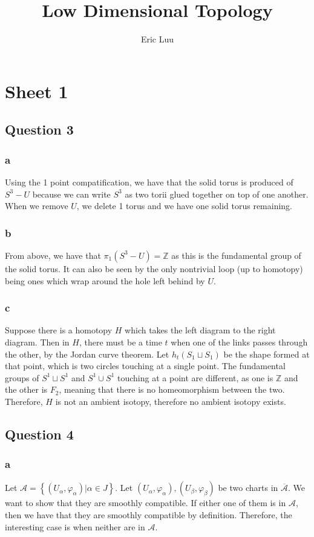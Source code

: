 \documentclass{article}
\title{Low Dimensional Topology}
\author{Eric Luu}
\theoremstyle{definition}
\numberwithin{theorem}{section}
\numberwithin{equation}{section}
\newcommand{\atlas}{\mathcal{A}}
\begin{document}
\section{Sheet 1}


\subsection{Question 3}

\subsubsection{a}
Using the 1 point compatification, we have that the solid torus is produced of $S^3 - U$ because we can write $S^3$ as two torii glued together on top of one another. When we remove $U$, we delete 1 torus and we have one solid torus remaining. 
\subsubsection{b}
From above, we have that $\pi_1(S^3 - U) = \mathbb{Z}$ as this is the fundamental group of the solid torus. It can also be seen by the only nontrivial loop (up to homotopy) being ones which wrap around the hole left behind by $U$. 
\subsubsection{c}
Suppose there is a homotopy $H$ which takes the left diagram to the right diagram. Then in $H$, there must be a time $t$ when one of the links passes through the other, by the Jordan curve theorem. Let $h_t(S_1 \sqcup S_1)$ be the shape formed at that point, which is two circles touching at a single point. The fundamental groups of $S^1 \sqcup S^1$ and $S^1 \cup S^1$ touching at a point are different, as one is $\mathbb{Z}$ and the other is $F_2$, meaning that there is no homeomorphism between the two. Therefore, $H$ is not an ambient isotopy, therefore no ambient isotopy exists. 

\subsection{Question 4}
\subsubsection{a}
Let $\atlas = \left\{(U_\alpha, \varphi_\alpha) | \alpha \in J\right\}$. Let $(U_\alpha, \varphi_\alpha), (U_\beta, \varphi_\beta)$ be two charts in $\overline{\atlas}$. We want to show that they are smoothly compatible. If either one of them is in $\atlas$, then we have that they are smoothly compatible by definition. Therefore, the interesting case is when neither are in $\atlas$. 
\end{document}
